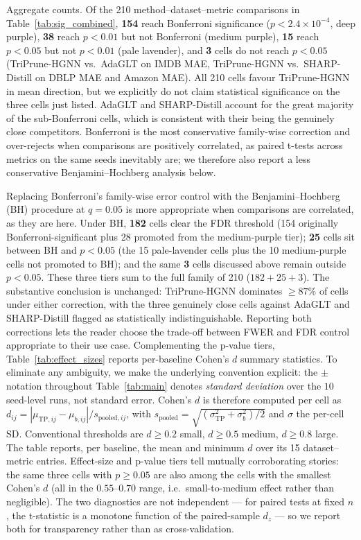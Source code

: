 \documentclass[10pt]{article}
\theoremstyle{plain}
\theoremstyle{definition}
\begin{document}
Aggregate counts. Of the 210 method--dataset--metric comparisons in Table~\ref{tab:sig_combined}, \textbf{154} reach Bonferroni significance ($p\!<\!2.4\!\times\!10^{-4}$, deep purple), \textbf{38} reach $p\!<\!0.01$ but not Bonferroni (medium purple), \textbf{15} reach $p\!<\!0.05$ but not $p\!<\!0.01$ (pale lavender), and \textbf{3} cells do not reach $p\!<\!0.05$ (TriPrune-HGNN vs.\ AdaGLT on IMDB MAE, TriPrune-HGNN vs.\ SHARP-Distill on DBLP MAE and Amazon MAE). All 210 cells favour TriPrune-HGNN in mean direction, but we explicitly do not claim statistical significance on the three cells just listed. AdaGLT and SHARP-Distill account for the great majority of the sub-Bonferroni cells, which is consistent with their being the genuinely close competitors. Bonferroni is the most conservative family-wise correction and over-rejects when comparisons are positively correlated, as paired t-tests across metrics on the same seeds inevitably are; we therefore also report a less conservative Benjamini--Hochberg analysis below.

Replacing Bonferroni's family-wise error control with the Benjamini--Hochberg (BH) procedure at $q\!=\!0.05$ is more appropriate when comparisons are correlated, as they are here. Under BH, \textbf{182} cells clear the FDR threshold (154 originally Bonferroni-significant plus 28 promoted from the medium-purple tier); \textbf{25} cells sit between BH and $p\!<\!0.05$ (the 15 pale-lavender cells plus the 10 medium-purple cells not promoted to BH); and the same \textbf{3} cells discussed above remain outside $p\!<\!0.05$. These three tiers sum to the full family of 210 ($182+25+3$). The substantive conclusion is unchanged: TriPrune-HGNN dominates $\geq\!87\%$ of cells under either correction, with the three genuinely close cells against AdaGLT and SHARP-Distill flagged as statistically indistinguishable. Reporting both corrections lets the reader choose the trade-off between FWER and FDR control appropriate to their use case. Complementing the p-value tiers, Table~\ref{tab:effect_sizes} reports per-baseline Cohen's $d$ summary statistics. To eliminate any ambiguity, we make the underlying convention explicit: the $\pm$ notation throughout Table~\ref{tab:main} denotes \emph{standard deviation} over the $10$ seed-level runs, not standard error. Cohen's $d$ is therefore computed per cell as $d_{ij}\!=\!|\mu_{\mathrm{TP},ij}\!-\!\mu_{b,ij}|/s_{\mathrm{pooled},ij}$, with $s_{\mathrm{pooled}}\!=\!\sqrt{(\sigma_{\mathrm{TP}}^2\!+\!\sigma_b^2)/2}$ and $\sigma$ the per-cell SD. Conventional thresholds are $d\!\geq\!0.2$ small, $d\!\geq\!0.5$ medium, $d\!\geq\!0.8$ large. The table reports, per baseline, the mean and minimum $d$ over its 15 dataset--metric entries. Effect-size and p-value tiers tell mutually corroborating stories: the same three cells with $p\!\geq\!0.05$ are also among the cells with the smallest Cohen's $d$ (all in the $0.55$--$0.70$ range, i.e.\ small-to-medium effect rather than negligible). The two diagnostics are not independent --- for paired tests at fixed $n$, the t-statistic is a monotone function of the paired-sample $d_{z}$ --- so we report both for transparency rather than as cross-validation.
\end{document}
